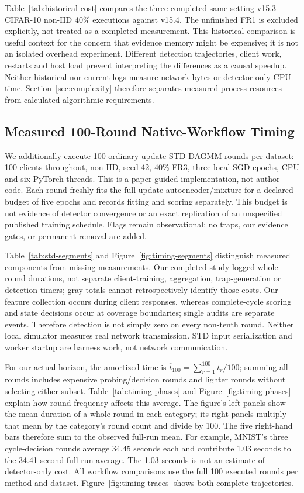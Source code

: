 \documentclass[conference]{IEEEtran}
\begin{document}
Table~\ref{tab:historical-cost} compares the three completed same-setting
v15.3 CIFAR-10 non-IID 40\% executions against v15.4. The unfinished FR1 is
excluded explicitly, not treated as a completed measurement. This historical
comparison is useful context for the concern that evidence memory might be
expensive; it is not an isolated overhead experiment. Different detection
trajectories, client work, restarts and host load prevent interpreting the
differences as a causal speedup. Neither historical nor current logs measure
network bytes or detector-only CPU time. Section~\ref{sec:complexity} therefore
separates measured process resources from calculated algorithmic requirements.


\subsection{Measured 100-Round Native-Workflow Timing}
We additionally execute 100 ordinary-update STD-DAGMM rounds per dataset:
100 clients throughout, non-IID, seed 42, 40\% FR3, three local SGD epochs,
CPU and six PyTorch threads. This is a paper-guided implementation, not
author code. Each round freshly fits the full-update autoencoder/mixture
for a declared budget of five epochs and records fitting and scoring
separately. This budget is not evidence of detector convergence or an exact
replication of an unspecified published training schedule. Flags remain
observational: no traps, our evidence gates, or permanent removal are added.

Table~\ref{tab:std-segments} and Figure~\ref{fig:timing-segments} distinguish
measured components from missing measurements. Our completed study logged
whole-round durations, not separate client-training, aggregation, trap-generation
or detection timers; gray totals cannot retrospectively identify those costs.
Our feature collection occurs during client responses, whereas complete-cycle
scoring and state decisions occur at coverage boundaries; single audits are
separate events. Therefore detection is not simply zero on every non-tenth round.
Neither local simulator measures real network transmission. STD input serialization
and worker startup are harness work, not network communication.

For our actual horizon, the amortized time is
$\overline t_{100}=\sum_{r=1}^{100}t_r/100$; summing all rounds includes expensive
probing/decision rounds and lighter rounds without selecting either subset.
Table~\ref{tab:timing-phases} and Figure~\ref{fig:timing-phases} explain how
round frequency affects this average. The figure's left panels show the mean
duration of a whole round in each category; its right panels multiply that
mean by the category's round count and divide by 100. The five right-hand
bars therefore sum to the observed full-run mean. For example, MNIST's three
cycle-decision rounds average 34.45 seconds each and contribute 1.03 seconds
to the 34.41-second full-run average. The 1.03 seconds is not an estimate of
detector-only cost. All workflow comparisons use the full 100 executed rounds
per method and dataset. Figure~\ref{fig:timing-traces} shows both complete
trajectories.
\end{document}
